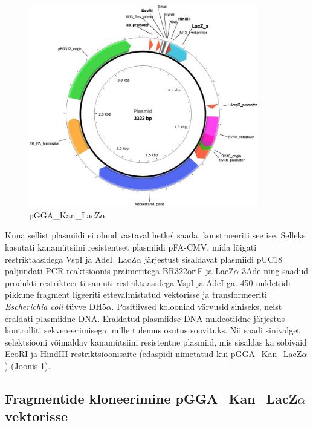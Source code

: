 \documentclass{trkut}%
\begin{document}
\begin{figure}[h!]
	\includegraphics[width=10cm]{plasm1.jpg}
	\caption{pGGA\_Kan\_LacZ$\alpha$}
	\label{plasm}
\end{figure}

Kuna sellist plasmiidi ei olnud vastaval hetkel saada, konstrueeriti see ise. Selleks kasutati kanamütsiini resistentset plasmiidi pFA-CMV, mida lõigati restriktaasidega VspI ja AdeI. LacZ$\alpha$ järjestust sisaldavat plasmiidi pUC18 paljundati PCR reaktsioonis praimeritega BR322oriF ja LacZ$\alpha$-3Ade ning saadud produkti restrikteeriti samuti restriktaasidega VspI ja AdeI-ga. 450 nukletiidi pikkune fragment ligeeriti ettevalmistatud vektorisse ja transformeeriti \textit{Escherichia coli} tüvve DH5$\alpha$.
Positiivsed kolooniad värvusid siniseks, neist eraldati plasmiidne DNA. Eraldatud plasmiidse DNA nukleotiidne järjestus kontrolliti sekveneerimisega, mille tulemus osutus soovituks. Nii saadi sinivalget selektsiooni võimaldav kanamütsiini resistentne plasmiid, mis sisaldas ka sobivaid EcoRI ja HindIII restriktsioonisaite (edaspidi nimetatud kui pGGA\_Kan\_LacZ$\alpha$) (Joonis \ref{plasm}).

\subsection{Fragmentide kloneerimine pGGA\_Kan\_LacZ$\alpha$ vektorisse}

\end{document}
